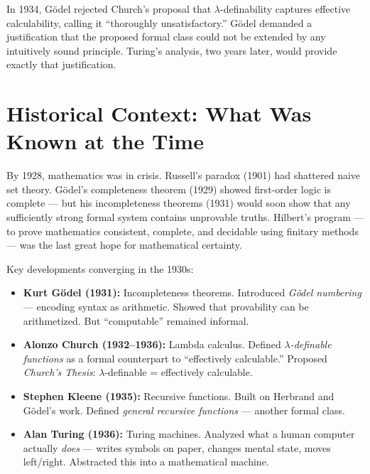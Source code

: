 In 1934, G\"odel rejected Church's proposal that $\lambda$-definability captures effective calculability, calling it ``thoroughly unsatisfactory.'' G\"odel demanded a justification that the proposed formal class could not be extended by any intuitively sound principle. Turing's analysis, two years later, would provide exactly that justification.

\section{Historical Context: What Was Known at the Time}
\label{sec:computation:context}

By 1928, mathematics was in crisis. Russell's paradox (1901) had shattered naive set theory. G\"odel's completeness theorem (1929) showed first-order logic is complete --- but his incompleteness theorems (1931) would soon show that any sufficiently strong formal system contains unprovable truths. Hilbert's program --- to prove mathematics consistent, complete, and decidable using finitary methods --- was the last great hope for mathematical certainty.

Key developments converging in the 1930s:

\begin{itemize}
\item \textbf{Kurt G\"odel (1931):} Incompleteness theorems. Introduced \emph{G\"odel numbering} --- encoding syntax as arithmetic. Showed that provability can be arithmetized. But ``computable'' remained informal.

\item \textbf{Alonzo Church (1932--1936):} Lambda calculus. Defined \emph{$\lambda$-definable functions} as a formal counterpart to ``effectively calculable.'' Proposed \emph{Church's Thesis}: $\lambda$-definable = effectively calculable.

\item \textbf{Stephen Kleene (1935):} Recursive functions. Built on Herbrand and G\"odel's work. Defined \emph{general recursive functions} --- another formal class.

\item \textbf{Alan Turing (1936):} Turing machines. Analyzed what a human computer actually \emph{does} --- writes symbols on paper, changes mental state, moves left/right. Abstracted this into a mathematical machine.
\end{itemize}

